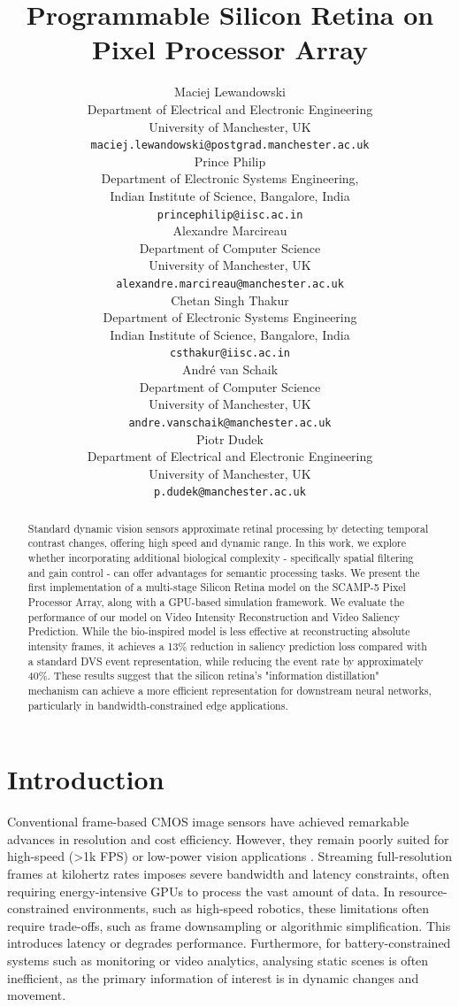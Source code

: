 \documentclass{article}
\title{Programmable Silicon Retina on Pixel Processor Array}
\author{
 Maciej Lewandowski \\
  Department of Electrical and Electronic Engineering \\
  University of Manchester, UK\\
 \texttt{maciej.lewandowski@postgrad.manchester.ac.uk} \\
   \And
 Prince Philip \\
   Department of Electronic Systems Engineering,\\ Indian Institute of Science, Bangalore, India\\
   \texttt{princephilip@iisc.ac.in} \\
  \And
   Alexandre Marcireau \\
  Department of Computer Science \\
  University of Manchester, UK\\
 \texttt{alexandre.marcireau@manchester.ac.uk} \\
  \And
  Chetan Singh Thakur \\
  Department of Electronic Systems Engineering \\
  Indian Institute of Science, Bangalore, India\\
 \texttt{csthakur@iisc.ac.in} \\
  \And
  André van Schaik \\
  Department of Computer Science \\
  University of Manchester, UK\\
 \texttt{andre.vanschaik@manchester.ac.uk} \\
  \And
 Piotr Dudek \\
  Department of Electrical and Electronic Engineering \\
  University of Manchester, UK\\
  \texttt{p.dudek@manchester.ac.uk} \\
}
\begin{document}
\maketitle
\begin{abstract}

Standard dynamic vision sensors approximate retinal processing by detecting temporal contrast changes, offering high speed and dynamic range. In this work, we explore whether incorporating additional biological complexity - specifically spatial filtering and gain control - can offer advantages for semantic processing tasks. We present the first implementation of a multi-stage Silicon Retina model on the SCAMP-5 Pixel Processor Array, along with a GPU-based simulation framework. We evaluate the performance of our model on Video Intensity Reconstruction and Video Saliency Prediction. While the bio-inspired model is less effective at reconstructing absolute intensity frames, it achieves a 13\% reduction in saliency prediction loss compared with a standard DVS event representation, while reducing the event rate by approximately 40\%. These results suggest that the silicon retina's "information distillation" mechanism can achieve a more efficient representation for downstream neural networks, particularly in bandwidth-constrained edge applications.

\end{abstract}




\section{Introduction}
Conventional frame-based CMOS image sensors have achieved remarkable advances in resolution and cost efficiency. However, they remain poorly suited for high-speed (>1k FPS) or low-power vision applications \cite{maqueda_event-based_2018, scheerlinck_fast_2020, magrini_drone_nodate, gallego_event-based_2022}. 
Streaming full-resolution frames at kilohertz rates imposes severe bandwidth and latency constraints, often requiring energy-intensive GPUs to process the vast amount of data. In resource-constrained environments, such as high-speed robotics, these limitations often require trade-offs, such as frame downsampling or algorithmic simplification. This introduces latency or degrades performance. Furthermore, for battery-constrained systems such as monitoring or video analytics, analysing static scenes is often inefficient, as the primary information of interest is in dynamic changes and movement. 
\end{document}
